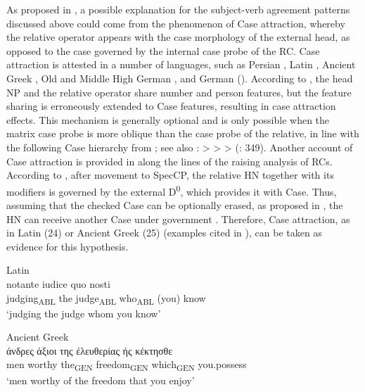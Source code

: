 \documentclass[output=paper]{langsci/langscibook}
\begin{document}
As proposed in \citet{Łęska2016}, a possible explanation for the subject-verb agreement patterns discussed above could come from the phenomenon of Case attraction, whereby the relative operator appears with the case morphology of the external head, as opposed to the case governed by the internal case probe of the RC. Case attraction is attested in a number of languages, such as Persian \citep{Aghaei2006}, Latin \citep{Bianchi1999}, Ancient Greek \citep{Bianchi1999}, Old and Middle High German \citep{Pittner1995}, and German (\citealt{Bader2006}). According to \citet{Bader2006}, the head NP and the relative operator share number and person features, but the feature sharing is erroneously extended to Case features, resulting in case attraction effects. This mechanism is generally optional and is only possible when the matrix case probe is more oblique than the case probe of the relative, in line with the following Case hierarchy from \citet[200--202]{Pittner1995}; see also \citet[122]{Grosu1994}: \GEN > \DAT > \ACC > \NOM (\citet{Georgi2014}: 349). Another account of Case attraction is provided in \citet{Bianchi1999} along the lines of the raising analysis of RCs. According to \citet{Bianchi1999}, after movement to SpecCP, the relative HN together with its modifiers is governed by the external D\textsuperscript{0}, which provides it with Case. Thus, assuming that the checked Case can be optionally erased, as proposed in \citet[279--282]{Chomsky1995}, the HN can receive another Case under government \citep[95]{Bianchi1999}. Therefore, Case attraction, as in Latin (24) or Ancient Greek (25) (examples cited in \citealt[94–95]{Bianchi1999}), can be taken as evidence for this hypothesis. 

\settowidth{}
\ea%
         Latin\label{ex:leska:24}\\
    \gll notante   iudice   quo     nosti        \\
         judging\textsubscript{ABL}   the judge\textsubscript{ABL}   who\textsubscript{ABL}   (you) know       \\
    \glt ‘judging the judge whom you know’ 
\z

\ea%
    Ancient Greek\label{ex:leska:25}\\
    \gll άνδρες 	άξιοι  	της 	έλευθερίας 	ής 	κέκτησθε\\
             men   worthy   the\textsubscript{GEN}   freedom\textsubscript{GEN}   which\textsubscript{GEN} you.possess  \\
    \glt  ‘men worthy of the freedom that you enjoy’         
\z
\end{document}
